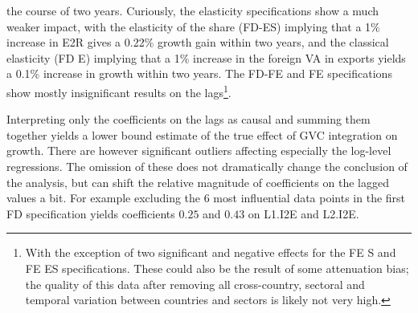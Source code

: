 \documentclass[a4paper]{article}
\begin{document}
\noindent the course of two years. Curiously, the elasticity specifications show a much weaker impact, with the elasticity of the share (FD-ES) implying that a 1\% increase in E2R gives a 0.22\% growth gain within two years, and the classical elasticity (FD E) implying that a 1\% increase in the foreign VA in exports yields a 0.1\% increase in growth within two years. The FD-FE and FE specifications show mostly insignificant results on the lags\footnote{With the exception of two significant and negative effects for the FE S and FE ES specifications. These could also be the result of some attenuation bias; the quality of this data after removing all cross-country, sectoral and temporal variation between countries and sectors is likely not very high.}. \newline

 Interpreting only the coefficients on the lags as causal and summing them together yields a lower bound estimate of the true effect of GVC integration on growth. There are however significant outliers affecting especially the log-level regressions. The omission of these does not dramatically change the conclusion of the analysis, but can shift the relative magnitude of coefficients on the lagged values a bit. For example excluding the 6 most influential data points in the first FD specification yields coefficients $0.25$ and $0.43$ on L1.I2E and L2.I2E. \newline 
\end{document}
